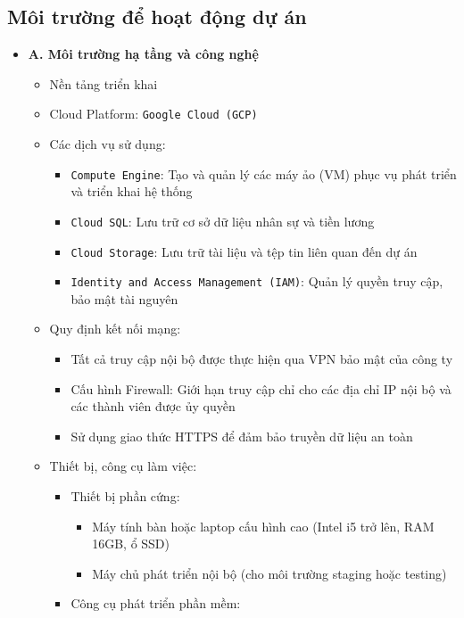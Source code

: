 \subsection{Môi trường để hoạt động dự án}
\begin{itemize}
    \item \textbf{A. Môi trường hạ tầng và công nghệ}
    \begin{itemize}
        \item Nền tảng triển khai
        \item Cloud Platform: \texttt{Google Cloud (GCP)}
        \item Các dịch vụ sử dụng:
        \begin{itemize}
            \item \texttt{Compute Engine}: Tạo và quản lý các máy ảo (VM) phục vụ phát triển và triển khai hệ thống
            \item \texttt{Cloud SQL}: Lưu trữ cơ sở dữ liệu nhân sự và tiền lương
            \item \texttt{Cloud Storage}: Lưu trữ tài liệu và tệp tin liên quan đến dự án
            \item \texttt{Identity and Access Management (IAM)}: Quản lý quyền truy cập, bảo mật tài nguyên
        \end{itemize}
    \item Quy định kết nối mạng:
    \begin{itemize}
        \item Tất cả truy cập nội bộ được thực hiện qua VPN bảo mật của công ty
        \item Cấu hình Firewall: Giới hạn truy cập chỉ cho các địa chỉ IP nội bộ và các thành viên được ủy quyền
        \item Sử dụng giao thức HTTPS để đảm bảo truyền dữ liệu an toàn
    \end{itemize}
    \item Thiết bị, công cụ làm việc:
    \begin{itemize}
        \item Thiết bị phần cứng:
        \begin{itemize}
            \item Máy tính bàn hoặc laptop cấu hình cao (Intel i5 trở lên, RAM 16GB, ổ SSD)
            \item Máy chủ phát triển nội bộ (cho môi trường staging hoặc testing)
        \end{itemize}
        \item Công cụ phát triển phần mềm:
        \begin{itemize}

\end{itemize}
\end{itemize}
\end{itemize}
\end{itemize}
